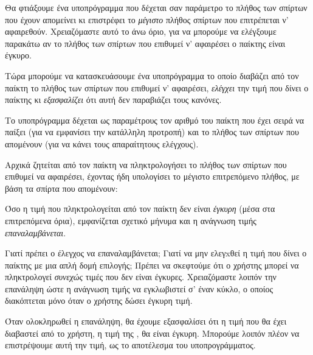\documentclass[a4paper,11pt,oneside]{book}
\begin{document}
Θα φτιάξουμε ένα υποπρόγραμμα που δέχεται σαν παράμετρο το πλήθος των σπίρτων που έχουν απομείνει κι επιστρέφει το \emph{μέγιστο} πλήθος σπίρτων που επιτρέπεται ν' αφαιρεθούν. Χρειαζόμαστε αυτό το άνω όριο, για να μπορούμε να ελέγξουμε παρακάτω αν το πλήθος των σπίρτων που επιθυμεί ν' αφαιρέσει ο παίκτης είναι έγκυρο. 


Τώρα μπορούμε να κατασκευάσουμε ένα υποπρόγραμμα το οποίο διαβάζει από τον παίκτη το πλήθος των σπίρτων που επιθυμεί ν' αφαιρέσει, \emph{ελέγχει} την τιμή που δίνει ο παίκτης κι \emph{εξασφαλίζει} ότι αυτή δεν παραβιάζει τους κανόνες. 

Το υποπρόγραμμα δέχεται ως παραμέτρους τον αριθμό  του παίκτη που έχει σειρά να παίξει (για να εμφανίσει την κατάλληλη προτροπή) και το πλήθος  των σπίρτων που απομένουν (για να κάνει τους απαραίτητους ελέγχους).


Αρχικά ζητείται από τον παίκτη να πληκτρολογήσει το πλήθος των σπίρτων που επιθυμεί να αφαιρέσει, έχοντας ήδη υπολογίσει το μέγιστο επιτρεπόμενο πλήθος, με βάση τα σπίρτα που απομένουν:


Όσο η τιμή που πληκτρολογείται από τον παίκτη δεν είναι \emph{έγκυρη} (μέσα στα επιτρεπόμενα όρια), εμφανίζεται σχετικό μήνυμα και η ανάγνωση τιμής \emph{επαναλαμβάνεται}.


Γιατί πρέπει ο έλεγχος να επαναλαμβάνεται; Γιατί να μην ελεγxθεί η τιμή που δίνει ο παίκτης με μια απλή δομή επιλογής; Πρέπει να σκεφτούμε ότι ο χρήστης μπορεί να πληκτρολογεί \emph{συνεχώς} τιμές που δεν είναι έγκυρες. Χρειαζόμαστε λοιπόν την επανάληψη ώστε η ανάγνωση τιμής να εγκλωβιστεί σ' έναν κύκλο, ο οποίος διακόπτεται μόνο όταν ο χρήστης δώσει έγκυρη τιμή.

Όταν ολοκληρωθεί η επανάληψη, θα έχουμε εξασφαλίσει ότι η τιμή που θα έχει διαβαστεί από το χρήστη, η τιμή της , θα είναι έγκυρη. Μπορούμε λοιπόν πλέον να επιστρέψουμε αυτή την τιμή, ως το αποτέλεσμα του υποπρογράμματος.
\end{document}
